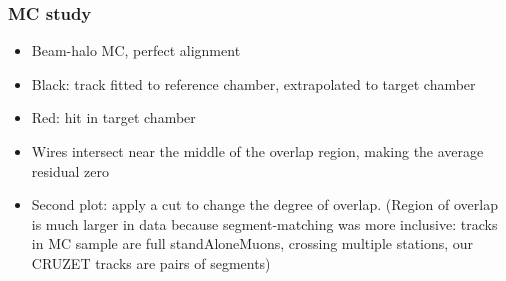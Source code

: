\documentclass[compress]{beamer}
\begin{document}
\begin{frame}
\frametitle{MC study}
\scriptsize
\begin{itemize}
\item Beam-halo MC, perfect alignment
\item Black: track fitted to reference chamber, extrapolated to target chamber
\item Red: hit in target chamber
\item Wires intersect near the middle of the overlap region, making the average residual zero
\item Second plot: apply a cut to change the degree of overlap.
  (Region of overlap is much larger in data because segment-matching
  was more inclusive: tracks in MC sample are full standAloneMuons,
  crossing multiple stations, our CRUZET tracks are pairs of segments)
\end{itemize}


\end{frame}
\end{document}
